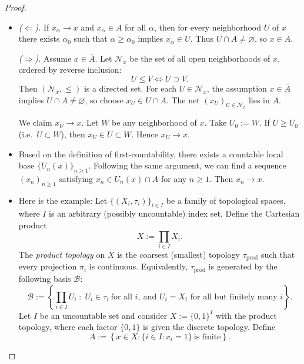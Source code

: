 \documentclass[12pt]{article}
\renewcommand{\(}{\left(}%
\renewcommand{\)}{\right)}%
\renewcommand{\[}{\left[}%
\renewcommand{\]}{\right]}%
\newtheorem{proof}{Proof.}}
\begin{document}
\begin{proof}
	\begin{itemize}
		\item \emph{($\Leftarrow$).}  
If $x_\alpha\to x$ and $x_\alpha\in A$ for all $\alpha$, then for every neighborhood $U$ of $x$ there exists $\alpha_0$ such that $\alpha\ge\alpha_0$ implies $x_\alpha\in U$. Thus $U\cap A\neq\varnothing$, so $x\in\overline{A}$.

\medskip

\emph{($\Rightarrow$).}  
Assume $x\in\overline{A}$. Let $\mathcal{N}_x$ be the set of all open neighborhoods of $x$, ordered by reverse inclusion:
\begin{equation*}
U\le V \iff U\supset V.
\end{equation*}
Then $(\mathcal{N}_x,\le)$ is a directed set. For each $U\in\mathcal{N}_x$, the assumption $x\in\overline{A}$ implies $U\cap A\neq\varnothing$, so choose $x_U\in U\cap A$. The net $(x_U)_{U\in\mathcal{N}_x}$ lies in $A$.

We claim $x_U\to x$. Let $W$ be any neighborhood of $x$. Take $U_0:=W$. If $U\ge U_0$ (i.e.\ $U\subset W$), then $x_U\in U\subset W$. Hence $x_U\to x$.
		\item Based on the definition of first-countability, there exists a countable local base $\{U_n(x)\}_{n\geq 1}$. Following the same argument, we can find a sequence $(x_n)_{n\geq 1}$ satisfying $x_n\in U_n(x)\cap A$ for any $n\geq 1$. Then $x_n\to x$.
		\item Here is the example:
		Let $\{(X_i,\tau_i)\}_{i\in I}$ be a family of topological spaces, where $I$ is an arbitrary (possibly uncountable) index set.  
Define the Cartesian product
\begin{equation*}
X := \prod_{i\in I} X_i.
\end{equation*}
The \emph{product topology} on $X$ is the coarsest (smallest) topology $\tau_{\mathrm{prod}}$ such that every projection $\pi_i$ is continuous.  
Equivalently, $\tau_{\mathrm{prod}}$ is generated by the following basis $\mathcal{B}$:
\begin{equation*}
\mathcal{B} := \left\{
\prod_{i\in I} U_i \;:\;
U_i\in\tau_i\ \text{for all }i,\ \text{and }U_i=X_i\text{ for all but finitely many }i
\right\}.
\end{equation*}
Let $I$ be an uncountable set and consider $X := \{0,1\}^I$ with the product topology, where each factor $\{0,1\}$ is given the discrete topology. Define
\begin{equation*}
A := \left\{
x\in X : \{i\in I : x_i = 1\}\ \text{is finite}
\right\}.
\end{equation*}


\end{itemize}
\end{proof}
\end{document}
